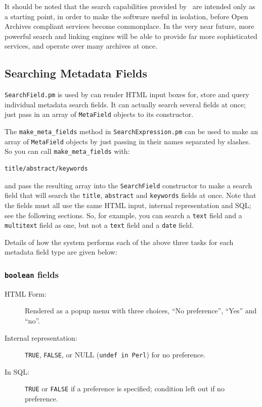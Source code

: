 It should be noted that the search capabilities provided by \eprints\ are intended only as a starting point, in order to make the software useful in isolation, before Open Archives compliant services become commonplace. In the very near future, more powerful search and linking engines will be able to provide far more sophisticated services, and operate over many archives at once.


\subsection{Searching Metadata Fields}

{\tt SearchField.pm} is used by can render HTML input boxes for, store and query individual metadata search fields. It can actually search several fields at once; just pass in an array of {\tt MetaField} objects to its constructor.

The {\tt make\_meta\_fields} method in {\tt SearchExpression.pm} can be used to make an array of {\tt MetaField} objects by just passing in their names separated by slashes. So you can call {\tt make\_meta\_fields} with:

\begin{verbatim}
title/abstract/keywords
\end{verbatim}

and pass the resulting array into the {\tt SearchField} constructor to make a search field that will search the {\tt title}, {\tt abstract} and {\tt keywords} fields at once. Note that the fields must all use the same HTML input, internal representation and SQL; see the following sections. So, for example, you can search a {\tt text} field and a {\tt multitext} field as one, but not a {\tt text} field and a {\tt date} field.

Details of how the system performs each of the above three tasks for each metadata field type are given below:


\subsubsection{{\tt boolean} fields}

\begin{description}
\item[HTML Form:] Rendered as a popup menu with three choices, ``No preference'', ``Yes'' and ``no''.

\item[Internal representation:] {\tt TRUE}, {\tt FALSE}, or NULL ({\tt undef in Perl}) for no preference.

\item[In SQL:] {\tt TRUE} or {\tt FALSE} if a preference is specified; condition left out if no preference.
\end{description}


